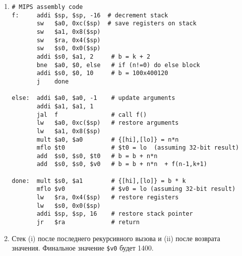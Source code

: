 \documentclass[12pt]{article}
\begin{document}
    \begin{enumerate}
        \item
        \begin{verbatim}
# MIPS assembly code
f:     addi $sp, $sp, -16  # decrement stack
       sw   $a0, 0xc($sp)  # save registers on stack
       sw   $a1, 0x8($sp)
       sw   $ra, 0x4($sp)
       sw   $s0, 0x0($sp)
       addi $s0, $a1, 2     # b = k + 2
       bne  $a0, $0, else   # if (n!=0) do else block
       addi $s0, $0, 10     # b = 100x400120
       j    done

else:  addi $a0, $a0, -1    # update arguments
       addi $a1, $a1, 1
       jal  f               # call f()
       lw   $a0, 0xc($sp)   # restore arguments
       lw   $a1, 0x8($sp)
       mult $a0, $a0        # {[hi],[lo]} = n*n
       mflo $t0             # $t0 = lo  (assuming 32-bit result)
       add  $s0, $s0, $t0   # b = b + n*n
       add  $s0, $s0, $v0   # b = b + n*n  + f(n-1,k+1)

done:  mult $s0, $a1        # {[hi],[lo]} = b * k
       mflo $v0             # $v0 = lo (assuming 32-bit result)
       lw   $ra, 0x4($sp)   # restore registers
       lw   $s0, 0x0($sp)
       addi $sp, $sp, 16    # restore stack pointer
       jr   $ra             # return
        \end{verbatim}

        \item Стек (i) после последнего рекурсивного вызова и (ii) после возврата значения. Финальное значение \texttt{\$v0} будет 1400.


\end{enumerate}
\end{document}
